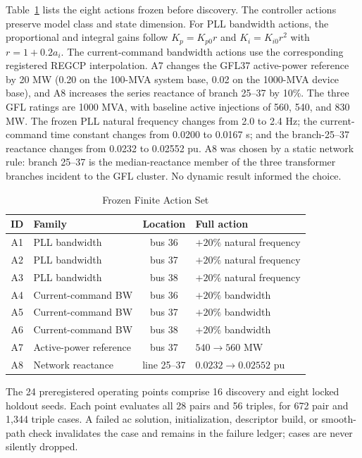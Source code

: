 Table~\ref{tab:actions} lists the eight actions frozen before discovery. The
controller actions preserve model class and state dimension. For PLL
bandwidth actions, the proportional and integral gains follow
$K_p=K_{p0}r$ and $K_i=K_{i0}r^2$ with $r=1+0.2a_i$. The current-command
bandwidth actions use the corresponding registered REGCP interpolation.
A7 changes the GFL37 active-power reference by 20 MW (0.20 on the 100-MVA
system base, 0.02 on the 1000-MVA device base), and A8 increases the series
reactance of branch 25--37 by 10\%. The three GFL ratings are 1000 MVA, with
baseline active injections of 560, 540, and 830 MW. The frozen PLL natural
frequency changes from 2.0 to 2.4 Hz; the current-command time constant changes
from 0.0200 to 0.0167 s; and the branch-25--37 reactance changes from 0.0232 to
0.02552 pu. A8 was
chosen by a static network rule: branch 25--37 is the median-reactance member
of the three transformer branches incident to the GFL cluster. No dynamic
result informed the choice.

\begin{table}[t]
\caption{Frozen Finite Action Set}
\label{tab:actions}
\centering
\footnotesize
\begin{tabular}{clcl}
\toprule
ID & Family & Location & Full action\\
\midrule
A1 & PLL bandwidth & bus 36 & $+20\%$ natural frequency\\
A2 & PLL bandwidth & bus 37 & $+20\%$ natural frequency\\
A3 & PLL bandwidth & bus 38 & $+20\%$ natural frequency\\
A4 & Current-command BW & bus 36 & $+20\%$ bandwidth\\
A5 & Current-command BW & bus 37 & $+20\%$ bandwidth\\
A6 & Current-command BW & bus 38 & $+20\%$ bandwidth\\
A7 & Active-power reference & bus 37 & $540\rightarrow560$ MW\\
A8 & Network reactance & line 25--37 & $0.0232\rightarrow0.02552$ pu\\
\bottomrule
\end{tabular}
\end{table}

The 24 preregistered operating points comprise 16 discovery and eight locked
holdout seeds. Each point evaluates all 28 pairs and 56 triples, for 672 pair
and 1,344 triple cases. A failed ac solution, initialization, descriptor
build, or smooth-path check invalidates the case and remains in the failure
ledger; cases are never silently dropped.

